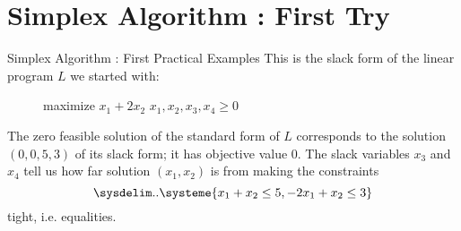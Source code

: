 \documentclass[32pt, aspectratio = 169]{beamer}
\begin{document}
\section{Simplex Algorithm : First Try}


\begin{frame}{Simplex Algorithm : First Practical Examples}
    This is the slack form of the linear program $L$ we started with:
    \begin{figure}
      \begin{linearProg}{
          maximize
        }{
          $x_1 + 2x_2$
        }{
        }{
          $x_1, x_2, x_3, x_4 \geq 0$
        }
      \end{linearProg}
    \end{figure}
    The zero feasible solution of the standard form of $L$ corresponds
    to the solution $(0, 0, 5, 3)$ of its slack form; it has objective
    value $0$. The slack variables $x_3$ and $x_4$ tell us how far
    solution $(x_1, x_2)$ is from making the constraints
    \[
    \sysdelim..{\systeme{x_1 + x_2 \leq 5, -2x_1 + x_2 \leq 3}}
    \]
    tight, i.e. equalities.
\end{frame}
\end{document}
